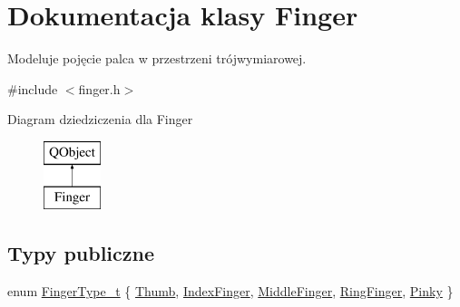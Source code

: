 \hypertarget{class_finger}{}\section{Dokumentacja klasy Finger}
\label{class_finger}


Modeluje pojęcie palca w przestrzeni trójwymiarowej.  




{\ttfamily \#include $<$finger.\+h$>$}

Diagram dziedziczenia dla Finger\begin{figure}[H]
\begin{center}
\leavevmode
\includegraphics[height=2.000000cm]{class_finger}
\end{center}
\end{figure}
\subsection*{Typy publiczne}
\begin{DoxyCompactItemize}
\item 
enum \hyperlink{class_finger_a365e6bba2e4877decf3c7641d29838c3}{Finger\+Type\+\_\+t} \{ \newline
\hyperlink{class_finger_a365e6bba2e4877decf3c7641d29838c3a4abadc231544b00c5b998e2e836f530c}{Thumb}, 
\hyperlink{class_finger_a365e6bba2e4877decf3c7641d29838c3a12cc2d85dc9a1a57ae93f22c1a8b94b4}{Index\+Finger}, 
\hyperlink{class_finger_a365e6bba2e4877decf3c7641d29838c3a9cc4bbb4f963d1c70d5862208715bff9}{Middle\+Finger}, 
\hyperlink{class_finger_a365e6bba2e4877decf3c7641d29838c3ab7e2faab0ba9830e3b7cd0b52c30e8fe}{Ring\+Finger}, 
\newline
\hyperlink{class_finger_a365e6bba2e4877decf3c7641d29838c3a3dda5e243e822002f6ceb4f921e475c8}{Pinky}
 \}
\end{DoxyCompactItemize}
